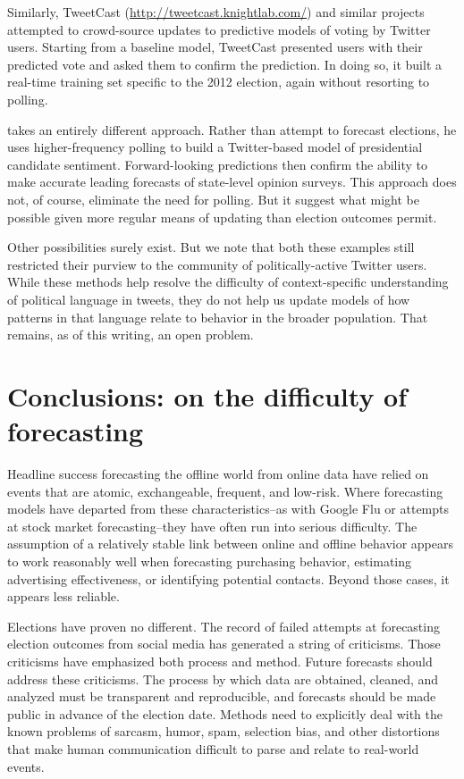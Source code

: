 \documentclass{article}
\begin{document}
Similarly, TweetCast (\url{http://tweetcast.knightlab.com/}) and
similar projects attempted to crowd-source updates to predictive
models of voting by Twitter users. Starting from a baseline model,
TweetCast presented users with their predicted vote and asked them to
confirm the prediction. In doing so, it built a real-time training set
specific to the 2012 election, again without resorting to polling. 

\cite{beauchamp2013} takes an entirely different approach. Rather than
attempt to forecast elections, he uses higher-frequency polling to
build a Twitter-based model of presidential candidate
sentiment. Forward-looking predictions then confirm the ability to
make accurate leading forecasts of state-level opinion surveys. This
approach does not, of course, eliminate the need for polling. But it
suggest what might be possible given more regular means of updating
than election outcomes permit. 

Other possibilities surely exist. But we note that both these examples
still restricted their purview to the community of politically-active
Twitter users. While these methods help resolve the difficulty of
context-specific understanding of political language in tweets, they
do not help us update models of how patterns in that language relate
to behavior in the broader population. That remains, as of
this writing, an open problem.

\section{Conclusions: on the difficulty of forecasting}
\label{sec:concl-diff-forec}

Headline success forecasting the offline world from online data have
relied on events that are atomic, exchangeable, frequent, and
low-risk. Where forecasting models have departed from these
characteristics--as with Google Flu or attempts at stock market
forecasting--they have often run into serious difficulty. The
assumption of a relatively stable link between online and offline
behavior appears to work reasonably well when forecasting purchasing
behavior, estimating advertising effectiveness, or identifying
potential contacts. Beyond those cases, it appears less reliable.

Elections have proven no different. The record of failed attempts at
forecasting election outcomes from social media has generated a string
of criticisms. Those criticisms have emphasized both process and
method. Future forecasts should address these criticisms. The process
by which data are obtained, cleaned, and analyzed must be transparent
and reproducible, and forecasts should be made public in advance of
the election date. Methods need to explicitly deal with the known
problems of sarcasm, humor, spam, selection bias, and other
distortions that make human communication difficult to parse and
relate to real-world events. 
\end{document}
